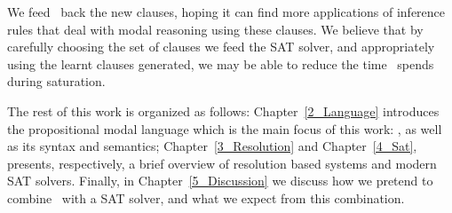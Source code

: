 We feed \ksp\ back the new clauses, hoping it can find more applications of
inference rules that deal with modal reasoning using these clauses. We believe
that by carefully choosing the set of clauses we feed the SAT solver, and
appropriately using the learnt clauses generated, we may be able to reduce the
time \ksp~spends during saturation. 

The rest of this work is organized as follows: Chapter~\ref{2_Language}
introduces the propositional modal language which is the main focus of this
work: , as well as its syntax and semantics;
Chapter~\ref{3_Resolution} and Chapter~\ref{4_Sat}, presents, respectively, a
brief overview of resolution based systems and modern SAT solvers. Finally,
in Chapter~\ref{5_Discussion} we discuss how we pretend to combine \ksp\ with a
SAT solver, and what we expect from this combination.
